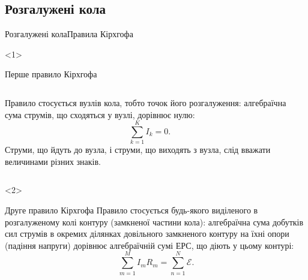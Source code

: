 \documentclass[onlytextwidth]{beamer}
\begin{document}
\subsection{Розгалужені кола}



\begin{frame}{Розгалужені кола}{Правила Кірхгофа}
	\begin{onlyenv}
		\begin{block}{\normalsize Перше правило Кірхгофа}\justifying\small
			\begin{columns}
				\begin{column}{0.8\linewidth}
					Правило стосується \alert{вузлів} кола, тобто точок його розгалуження: алгебраїчна сума струмів, що сходяться у вузлі,
					дорівнює нулю:
					\begin{equation*}
						\sum\limits_{k=1}^{K} I_k = 0.
					\end{equation*}
					\alert{Струми, що йдуть до вузла, і струми, що виходять з вузла, слід вважати величинами різних знаків.}
				\end{column}
				\begin{column}{0.2\linewidth}
					
				\end{column}
			\end{columns}
		\end{block}
	\end{onlyenv}
	\begin{onlyenv}
		\begin{block}{\normalsize Друге правило Кірхгофа}\justifying\small
			Правило стосується будь-якого виділеного в розгалуженому колі \alert{контуру (замкненої частини кола)}: алгебраїчна сума добутків сил
			струмів в окремих ділянках
			довільного замкненого контуру на їхні опори (падіння напруги) дорівнює алгебраїчній сумі ЕРС, що діють у цьому контурі:
			\begin{equation*}
				\sum\limits_{m=1}^{M} I_m R_m = \sum\limits_{n=1}^{N} \mathcal{E}.
			\end{equation*}
		\end{block}
		
	\end{onlyenv}
\end{frame}
\end{document}
